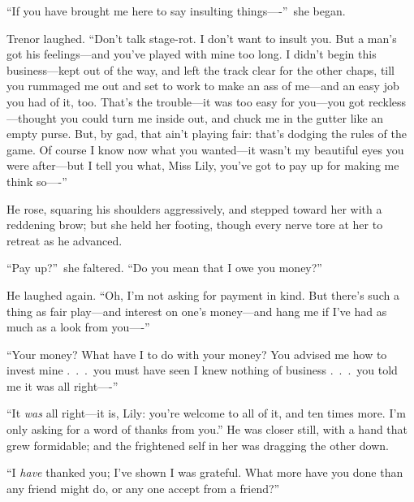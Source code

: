 \documentclass[12pt,a4paper]{book}
\begin{document}
``If you have brought me here to say insulting things----''\ she
began.





Trenor laughed. ``Don't talk stage-rot. I don't want to insult
you. But a man's got his feelings---and you've played with mine
too long. I didn't begin this business---kept out of the way, and
left the track clear for the other chaps, till you rummaged me
out and set to work to make an ass of me---and an easy job you had
of it, too. That's the trouble---it was too easy for
you---you got reckless---thought you could turn me inside out, and
chuck me in the gutter like an empty purse. But, by gad, that
ain't playing fair: that's dodging the rules of the game. Of
course I know now what you wanted---it wasn't my beautiful eyes
you were after---but I tell you what, Miss Lily, you've got to pay
up for making me think so----''





He rose, squaring his shoulders aggressively, and stepped toward
her with a reddening brow; but she held her footing, though every
nerve tore at her to retreat as he advanced.





``Pay up?''\ she faltered. ``Do you mean that I owe you money?''





He laughed again. ``Oh, I'm not asking for payment in kind. But
there's such a thing as fair play---and interest on one's
money---and hang me if I've had as much as a look from you----''





``Your money? What have I to do with your money? You advised me
how to invest mine .\ .\ .\ you must have seen I knew nothing of
business .\ .\ .\ you told me it was all right----''





``It \textit{was} all right---it is, Lily: you're welcome to all of it, and
ten times more. I'm only asking for a word of thanks from you.'' 
He was closer still, with a hand that grew formidable; and the
frightened self in her was dragging the other down.





``I \textit{have} thanked you; I've shown I was grateful. What more have
you done than any friend might do, or any one accept from a
friend?''
\end{document}
